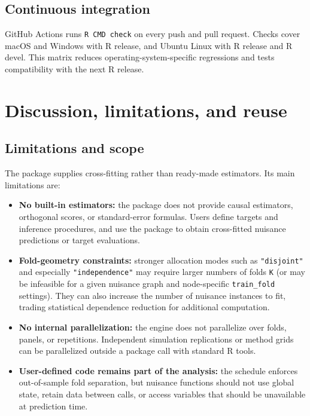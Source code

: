 \subsection{Continuous integration}\label{continuous-integration}

GitHub Actions runs \texttt{R\ CMD\ check} on every push and pull request. Checks cover macOS and Windows with R release, and Ubuntu Linux with R release and R devel. This matrix reduces operating-system-specific regressions and tests compatibility with the next R release.

\section{Discussion, limitations, and reuse}\label{sec:discussion}

\subsection{Limitations and scope}\label{limitations-and-scope}

The package supplies cross-fitting rather than ready-made estimators. Its main limitations are:

\begin{itemize}
\tightlist
\item
  \textbf{No built-in estimators:} the package does not provide causal estimators, orthogonal scores, or standard-error formulas. Users define targets and inference procedures, and use the package to obtain cross-fitted nuisance predictions or target evaluations.
\item
  \textbf{Fold-geometry constraints:} stronger allocation modes such as \texttt{"disjoint"} and especially \texttt{"independence"} may require larger numbers of folds \texttt{K} (or may be infeasible for a given nuisance graph and node-specific \texttt{train\_fold} settings). They can also increase the number of nuisance instances to fit, trading statistical dependence reduction for additional computation.
\item
  \textbf{No internal parallelization:} the engine does not parallelize over folds, panels, or repetitions. Independent simulation replications or method grids can be parallelized outside a package call with standard R tools.
\item
  \textbf{User-defined code remains part of the analysis:} the schedule enforces out-of-sample fold separation, but nuisance functions should not use global state, retain data between calls, or access variables that should be unavailable at prediction time.
\end{itemize}

